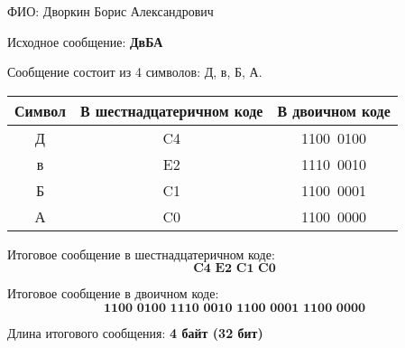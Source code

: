\begin{enumerate*}
\item ФИО: Дворкин Борис Александрович

\item Исходное сообщение: \textbf{ДвБА}

\item Сообщение состоит из 4 символов: Д, в, Б, А.

\begin{center}
	\begin{tabular}{|c|c|c|}
		\hline
		\textbf{Символ} & \textbf{В шестнадцатеричном коде} & \textbf{В двоичном коде} \\
		\hline
		Д               & C4                                & 1100\ 0100               \\
		в               & E2                                & 1110\ 0010               \\
		Б               & C1                                & 1100\ 0001               \\
		А               & C0                                & 1100\ 0000               \\
		\hline
	\end{tabular}
\end{center}

\item Итоговое сообщение в шестнадцатеричном коде:
\[
	\textbf{C4 E2 C1 C0}
\]

\item Итоговое сообщение в двоичном коде:
\[
	\textbf{1100 0100 1110 0010 1100 0001 1100 0000}
\]

\item Длина итогового сообщения: \textbf{4 байт (32 бит)}
\end{enumerate*}
